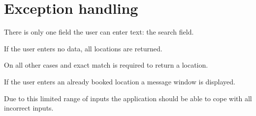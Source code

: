 \chapter{Exception handling}\label{ch:exception} %

There is only one field the user can enter text: the search field.

If the user enters no data, all locations are returned.

On all other cases and exact match is required to return a location.

If the user enters an already booked location a message window is displayed.

Due to this limited range of inputs the application should be able to cope with all incorrect inputs.